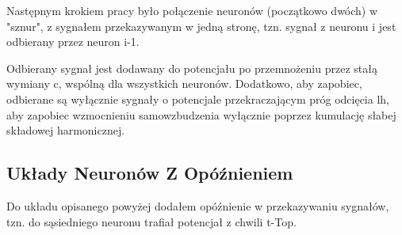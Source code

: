\documentclass[12pt]{article}
\begin{document}
  Następnym krokiem pracy było połączenie neuronów (początkowo dwóch) w "sznur", z sygnałem przekazywanym w jedną stronę, tzn. sygnał z neuronu i jest odbierany przez neuron i-1.
  
  Odbierany sygnał jest dodawany do potencjału po przemnożeniu przez stałą wymiany c, wspólną dla wszystkich neuronów. Dodatkowo, aby zapobiec, odbierane są wyłącznie sygnały o potencjale przekraczającym próg odcięcia lh, aby zapobiec wzmocnieniu samowzbudzenia wyłącznie poprzez kumulację słabej składowej harmonicznej.
  
  \subsection{Układy Neuronów Z Opóźnieniem}
  
  Do układu opisanego powyżej dodałem opóźnienie w przekazywaniu sygnałów, tzn. do sąsiedniego neuronu trafiał potencjał z chwili t-Top.
  
  \newpage
  
  
  
  
  
\end{document}
